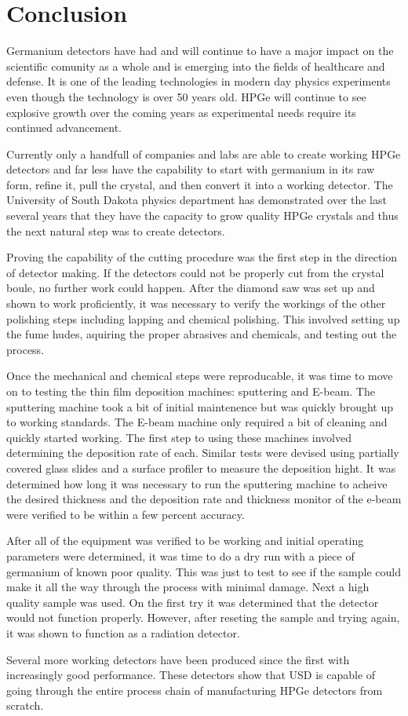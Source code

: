 \chapter{Conclusion}
Germanium detectors have had and will continue to have a major impact on the scientific comunity as a whole and is emerging into the fields of healthcare and defense.
It is one of the leading technologies in modern day physics experiments even though the technology is over 50 years old.
HPGe will continue to see explosive growth over the coming years as experimental needs require its continued advancement.

Currently only a handfull of companies and labs are able to create working HPGe detectors and far less have the capability to start with germanium in its raw form, refine it, pull the crystal, and then convert it into a working detector.
The University of South Dakota physics department has demonstrated over the last several years that they have the capacity to grow quality HPGe crystals and thus the next natural step was to create detectors.

Proving the capability of the cutting procedure was the first step in the direction of detector making.
If the detectors could not be properly cut from the crystal boule, no further work could happen.
After the diamond saw was set up and shown to work proficiently, it was necessary to verify the workings of the other polishing steps including lapping and chemical polishing.
This involved setting up the fume hudes, aquiring the proper abrasives and chemicals, and testing out the process.

Once the mechanical and chemical steps were reproducable, it was time to move on to testing the thin film deposition machines: sputtering and E-beam.
The sputtering machine took a bit of initial maintenence but was quickly brought up to working standards.
The E-beam machine only required a bit of cleaning and quickly started working.
The first step to using these machines involved determining the deposition rate of each.
Similar tests were devised using partially covered glass slides and a surface profiler to measure the deposition hight.
It was determined how long it was necessary to run the sputtering machine to acheive the desired thickness and the deposition rate and thickness monitor of the e-beam were verified to be within a few percent accuracy.

After all of the equipment was verified to be working and initial operating parameters were determined, it was time to do a dry run with a piece of germanium of known poor quality.
This was just to test to see if the sample could make it all the way through the process with minimal damage.
Next a high quality sample was used.
On the first try it was determined that the detector would not function properly.
However, after reseting the sample and trying again, it was shown to function as a radiation detector.

Several more working detectors have been produced since the first with increasingly good performance.
These detectors show that USD is capable of going through the entire process chain of manufacturing HPGe detectors from scratch.
